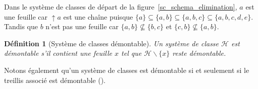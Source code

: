 \documentclass[a4paper]{report}
\newtheorem{definition}{Définition}[chapter]
\begin{document}
Dans le système de classes de départ de la figure~\ref{sc_schema_elimination}, $a$ est une feuille car $\uparrow a$ est une cha\^ine
 puisque $\{a\} \subseteq \{a, b\} \subseteq \{a, b, c\} \subseteq \{a, b, c, d, e\}$.
Tandis que $b$ n'est pas une feuille car $\{a, b\}  \not\subseteq \{b, c\}$ et $\{c, b\}  \not\subseteq \{a, b\}$.


\begin{definition}[Système de classes démontable]

\label{sysclassdemontable}
Un système de classe $\mathcal{H}$ est démontable s'il contient une feuille $x$ tel que $\mathcal{H} \backslash \{x\}$ 
reste démontable.
\end{definition}

Notons également qu'un système de classes est démontable si et seulement si le treillis associé est démontable (\cite{par_clu}).
\end{document}
